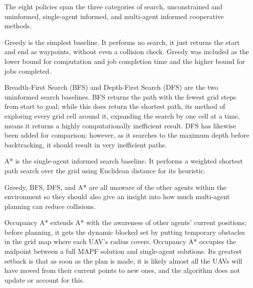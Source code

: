 The eight policies span the three categories of search, unconstrained and uninformed, single-agent informed, and multi-agent informed cooperative methods.\par

\vspace{1em}

Greedy is the simplest baseline. It performs no search, it just returns the start and end as waypoints, without even a collision check. Greedy was included as the lower bound for computation and job completion time and the higher bound for jobs completed. \par

\vspace{1em}

Breadth-First Search (BFS) and Depth-First Search (DFS) are the two uninformed search baselines. BFS returns the path with the fewest grid steps from start to goal; while this does return the shortest path, its method of exploring every grid cell around it, expanding the search by one cell at a time, means it returns a highly computationally inefficient result. DFS has likewise been added for comparison; however, as it searches to the maximum depth before backtracking, it should result in very inefficient paths. \par

\vspace{1em}

A* is the single-agent informed search baseline. It performs a weighted shortest path search over the grid using Euclidean distance for its heuristic. \par

\vspace{1em}

Greedy, BFS, DFS, and A* are all unaware of the other agents within the environment so they should also give an insight into how much multi-agent planning can reduce collisions. \par

\vspace{1em}

Occupancy A* extends A* with the awareness of other agents' current positions; before planning, it gets the dynamic blocked set by putting temporary obstacles in the grid map where each UAV's radius covers. Occupancy A* occupies the midpoint between a full MAPF solution and single-agent solutions. Its greatest setback is that as soon as the plan is made, it is likely almost all the UAVs will have moved from their current points to new ones, and the algorithm does not update or account for this. \par

